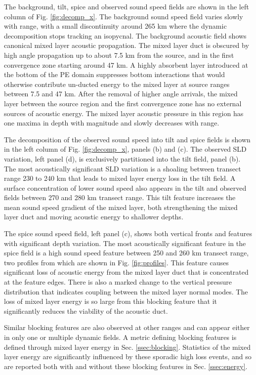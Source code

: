 \documentclass[preprint,NumberedRefs]{JASA}
\begin{document}
The background, tilt, spice and observed sound speed fields are shown in the left column of Fig. \ref{fig:decomp_x}. The background sound speed field varies slowly with range, with a small discontinuity around 265 km where the dynamic decomposition stops tracking an isopycnal. The background acoustic field shows canonical mixed layer acoustic propagation. The mixed layer duct is obscured by high angle propagation up to about 7.5 km from the source, and in the first convergence zone starting around 47 km. A highly absorbent layer introduced at the bottom of the PE domain suppresses bottom interactions that would otherwise contribute un-ducted energy to the mixed layer at source ranges between 7.5 and 47 km. After the removal of higher angle arrivals, the mixed layer between the source region and the first convergence zone has no external sources of acoustic energy. The mixed layer acoustic pressure in this region has one maxima in depth with magnitude and slowly decreases with range.

The decomposition of the observed sound speed into tilt and spice fields is shown in the left column of Fig. \ref{fig:decomp_x}, panels (b) and (c). The observed SLD variation, left panel (d), is exclusively partitioned into the tilt field, panel (b). The most acoustically significant SLD variation is a shoaling between transect range 230 to 240 km that leads to mixed layer energy loss in the tilt field. A surface concentration of lower sound speed also appears in the tilt and observed fields between 270 and 280 km transect range. This tilt feature increases the mean sound speed gradient of the mixed layer, both strengthening the mixed layer duct and moving acoustic energy to shallower depths.

The spice sound speed field, left panel (c), shows both vertical fronts and features with significant depth variation. The most acoustically significant feature in the spice field is a high sound speed feature between 250 and 260 km transect range, two profiles from which are shown in Fig. \ref{fig:profiles}. This feature causes significant loss of acoustic energy from the mixed layer duct that is concentrated at the feature edges. There is also a marked change to the vertical pressure distribution that indicates coupling between the mixed layer normal modes. The loss of mixed layer energy is so large from this blocking feature that it significantly reduces the viability of the acoustic duct.

Similar blocking features are also observed at other ranges and can appear either in only one or multiple dynamic fields. A metric defining blocking features is defined through mixed layer energy in Sec. \ref{ssec:blocking}. Statistics of the mixed layer energy are significantly influenced by these sporadic high loss events, and so are reported both with and without these blocking features in Sec. \ref{ssec:energy}.
\end{document}
